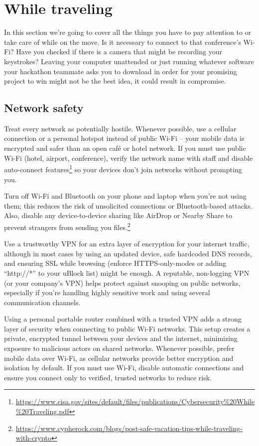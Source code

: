 \chapter{While traveling}

In this section we're going to cover all the things you
have to pay attention to or take care of while on the
move. Is it necessary to connect to that conference's
Wi-Fi? Have you checked if there is a camera that might be
recording your keystrokes? Leaving your computer
unattended or just running whatever software your
hackathon teammate asks you to download in order for your
promising project to win might not be the best idea, it
could result in compromise.

\section{Network safety}

Treat every network as potentially hostile. Whenever
possible, use a cellular connection or a personal hotspot
instead of public Wi-Fi -- your mobile data is encrypted
and safer than an open café or hotel network. If you must
use public Wi-Fi (hotel, airport, conference), verify the
network name with staff and disable auto-connect
features\footnote{\url{https://www.cisa.gov/sites/default/files/publications/Cybersecurity\%20While\%20Traveling.pdf}}
so your devices don't join networks without prompting you.

Turn off Wi-Fi and Bluetooth on your phone and laptop when
you're not using them; this reduces the risk of
unsolicited connections or Bluetooth-based attacks. Also,
disable any device-to-device sharing like AirDrop or
Nearby Share to prevent strangers from sending you
files.\footnote{\url{https://www.cypherock.com/blogs/post-safe-vacation-tips-while-traveling-with-crypto}}

Use a trustworthy VPN for an extra layer of encryption for
your internet traffic, although in most cases by using an
updated device, safe hardcoded DNS records, and ensuring
SSL while browsing (enforce HTTPS-only-modes or adding
``http://*'' to your uBlock list) might be enough. A
reputable, non-logging VPN (or your company's VPN) helps
protect against snooping on public networks, especially if
you're handling highly sensitive work and using several
communication channels.

Using a personal portable router combined with a trusted
VPN adds a strong layer of security when connecting to
public Wi-Fi networks. This setup creates a private,
encrypted tunnel between your devices and the internet,
minimizing exposure to malicious actors on shared
networks. Whenever possible, prefer mobile data over
Wi-Fi, as cellular networks provide better encryption and
isolation by default. If you must use Wi-Fi, disable
automatic connections and ensure you connect only to
verified, trusted networks to reduce risk.

